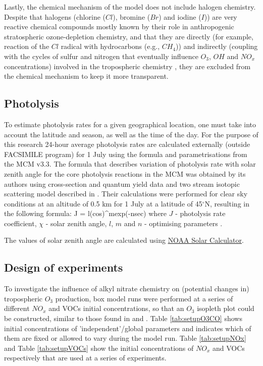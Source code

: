 \documentclass[11pt,a4paper]{article}
\newcounter{matriz}
\newenvironment{matriz}{\refstepcounter{matriz}\equation}{\tag{\thematriz}\endequation}
\begin{document}
Lastly, the chemical mechanism of the model does not include halogen chemistry. Despite that halogens (chlorine ($Cl$), bromine ($Br$) and iodine ($I$)) are very reactive chemical compounds mostly known by their role in anthropogenic stratospheric ozone-depletion chemistry, and that they are directly (for example, reaction of the $Cl$ radical with hydrocarbons (e.g., $CH_4$)) and indirectly (coupling with the cycles of sulfur and nitrogen that eventually influence $O_3$, $OH$ and $NO_x$ concentrations) involved in the tropospheric chemistry \citep{VonGlasow2014,Platt2003}, they are excluded from the chemical mechanism to keep it more transparent.
\subsection{Photolysis}\label{sec:method_photolysis}
To estimate photolysis rates for a given geographical location, one must take into account the latitude and season, as well as the time of the day. For the purpose of this research 24-hour average photolysis rates are calculated externally (outside FACSIMILE program) for 1 July using the formula and parametrisations from the MCM v3.3. The formula that describes variation of photolysis rate with solar zenith angle for the core photolysis reactions in the MCM was obtained by its authors using cross-section and quantum yield data and two stream isotopic scattering model described in \citep{Hayman1997}. Their calculations were performed for clear sky conditions at an altitude of 0.5 km for 1 July at a latitude of 45$^{\circ}$N, resulting in the following formula:
\begin{matriz} \label{eq:MCMphotolysis}
J = l(cos\chi)^mexp(-nsec\chi)
\end{matriz}
where $J$ - photolysis rate coefficient, $\chi$ - solar zenith angle, $l$, $m$ and $n$ - optimising parameters \citep{Jenkin1997,Saunders2003}.

The values of solar zenith angle are calculated using \href{http://www.esrl.noaa.gov/gmd/grad/solcalc/}{NOAA Solar Calculator}.

\subsection{Design of experiments}\label{sec:method_expdesign}
To investigate the influence of alkyl nitrate chemistry on (potential changes in) tropospheric $O_3$ production, box model runs were performed at a series of different $NO_x$ and VOCs initial concentrations, so that an $O_3$ isopleth plot could be constructed, similar to those found in \citep{Dodge1977} and \citep{Sillman1999}.   Table \ref{tab:setupO3CO} shows initial concentrations of 'independent'/global parameters and indicates which of them are fixed or allowed to vary during the model run. Table \ref{tab:setupNOx} and Table \ref{tab:setupVOCs} show the initial concentrations of $NO_x$ and VOCs respectively that are used at a series of experiments.
\end{document}
